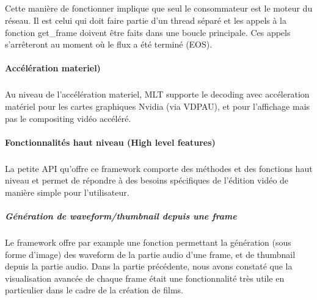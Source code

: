 \subparagraph{}

Cette manière de fonctionner implique que seul le consommateur est
le moteur du réseau. Il est celui qui doit faire partie d'un thread
séparé et les appels à la fonction get\_frame doivent être faits dans
une boucle principale.  Ces appels s'arrêteront au moment où le flux a
été terminé (EOS).


\paragraph{Accélération materiel)}

\subparagraph{}

Au niveau de l'accélération materiel, MLT supporte le decoding
avec accéleration matériel pour les cartes graphiques Nvidia
 (via VDPAU), et pour l'affichage
mais pas le compositing vidéo accéléré.


\paragraph{Fonctionnalités haut niveau (High level features)}

\subparagraph{}

La petite API qu'offre ce framework comporte des méthodes et des fonctions
haut niveau et permet de répondre à des besoins spécifiques de
l'édition vidéo de manière simple pour l'utilisateur.

\subparagraph{Génération de waveform/thumbnail depuis une frame}

\subparagraph{}

Le framework offre par example une fonction permettant la génération
(sous forme d'image) des waveform de la partie audio d'une frame, et de
thumbnail depuis la partie audio.  Dans la partie précédente, nous
avons constaté que la visualisation avancée de chaque frame était une
fonctionnalité très utile en particulier dans le cadre de la création
de films.

